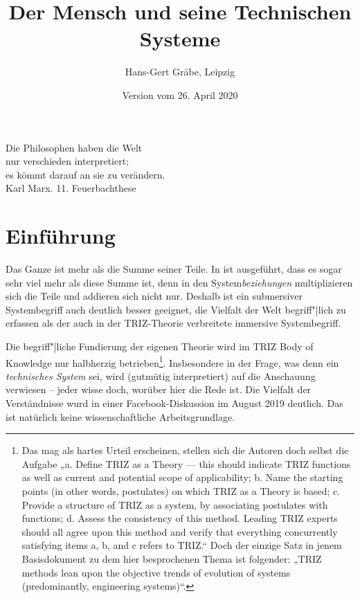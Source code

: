 \documentclass[11pt,a4paper]{article}
\title{Der Mensch und seine Technischen Systeme}
\author{Hans-Gert Gräbe, Leipzig}
\date{Version vom 26. April 2020}
\begin{document}
\maketitle

\begin{flushright}
  Die Philosophen haben die Welt\\ nur verschieden interpretiert;\\ es kömmt
  darauf an sie zu verändern.\\ Karl Marx. 11. Feuerbachthese
\end{flushright}

\section{Einführung}

Das Ganze ist mehr als die Summe seiner Teile. In \cite{Graebe2020} ist
ausgeführt, dass es sogar sehr viel mehr als diese Summe ist, denn in den
System\emph{beziehungen} multiplizieren sich die Teile und addieren sich nicht
nur.  Deshalb ist ein submersiver Systembegriff auch deutlich besser geeignet,
die Vielfalt der Welt begriff"|lich zu erfassen als der auch in der
TRIZ-Theorie verbreitete immersive Systembegriff.

Die begriff"|liche Fundierung der eigenen Theorie wird im TRIZ Body of
Knowledge \cite{TBK-2007} nur halbherzig betrieben\footnote{Das mag als hartes
  Urteil erscheinen, stellen sich die Autoren doch selbst die Aufgabe „a.
  Define TRIZ as a Theory — this should indicate TRIZ functions as well as
  current and potential scope of applicability; b.  Name the starting points
  (in other words, postulates) on which TRIZ as a Theory is based; c.  Provide
  a structure of TRIZ as a system, by associating postulates with functions;
  d.  Assess the consistency of this method. Leading TRIZ experts should all
  agree upon this method and verify that everything concurrently satisfying
  items a, b, and c refers to TRIZ.“ Doch der einzige Satz in jenem
  Basisdokument zu dem hier besprochenen Thema ist folgender: „TRIZ methods
  lean upon the objective trends of evolution of systems (predominantly,
  engineering systems)“.}. Insbesondere in der Frage, was denn ein
\emph{technisches System} sei, wird (gutmütig interpretiert) auf die
Anschauung verwiesen -- jeder wisse doch, worüber hier die Rede ist. Die
Vielfalt der Verständnisse wurd in einer Facebook-Diskussion
\cite{Graebe2019b} im August 2019 deutlich.  Das ist natürlich keine
wissenschaftliche Arbeitsgrundlage.
\end{document}
